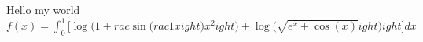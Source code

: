 \documentclass[preview]{standalone}
\begin{document}
\begin{center}
Hello my world\(f(x) = \int_{0}^{1} \big[ \log\big( 1 + rac{\sin\big( rac{1}{x} 
ight)}{x^2} 
ight) + \log\big( \sqrt{e^x + \cos(x)} 
ight) 
ight] dx\)
\end{center}
\end{document}
